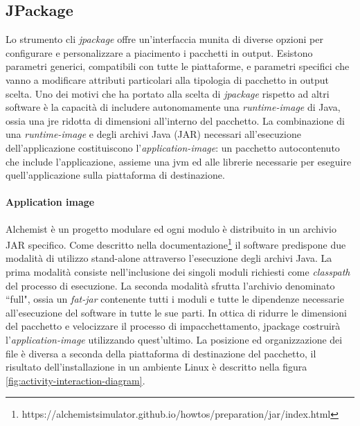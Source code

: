 \subsection{JPackage}\label{sec:design-jpackage} Lo strumento \ac{cli} \textit{jpackage} offre un'interfaccia munita di diverse opzioni per configurare e personalizzare a piacimento i pacchetti in output. Esistono parametri generici, compatibili con tutte le piattaforme, e parametri specifici che vanno a modificare attributi particolari alla tipologia di pacchetto in output scelta. Uno dei motivi che ha portato alla scelta di \textit{jpackage} rispetto ad altri software è la capacità di includere autonomamente una \textit{runtime-image} di Java, ossia una \ac{jre} ridotta di dimensioni all'interno del pacchetto. La combinazione di una \textit{runtime-image} e degli archivi Java (JAR) necessari all'esecuzione dell'applicazione costituiscono l'\textit{application-image}: un pacchetto autocontenuto che include l'applicazione, assieme una \ac{jvm} ed alle librerie necessarie per eseguire quell'applicazione sulla piattaforma di destinazione.

\paragraph{Application image} Alchemist è un progetto modulare ed ogni modulo è distribuito in un archivio JAR specifico. Come descritto nella documentazione\footnote{https://alchemistsimulator.github.io/howtos/preparation/jar/index.html} il software predispone due modalità di utilizzo stand-alone attraverso l'esecuzione degli archivi Java. La prima modalità consiste nell'inclusione dei singoli moduli richiesti come \textit{classpath} del processo di esecuzione. La seconda modalità sfrutta l'archivio denominato ``full", ossia un \textit{fat-jar} contenente tutti i moduli e tutte le dipendenze necessarie all'esecuzione del software in tutte le sue parti. In ottica di ridurre le dimensioni del pacchetto e velocizzare il processo di impacchettamento, jpackage costruirà l'\textit{application-image} utilizzando quest'ultimo. La posizione ed organizzazione dei file è diversa a seconda della piattaforma di destinazione del pacchetto, il risultato dell'installazione in un ambiente Linux è descritto nella figura \ref{fig:activity-interaction-diagram}.  

